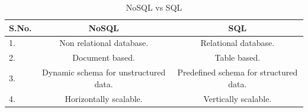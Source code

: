 \documentclass[BTech]{srmuthesis}
\begin{document}
\begin{table}[H]
	\begin{center}
		\label{tab:table1}
		\begin{tabular}{l|c|c}
			\textbf{S.No.} & \textbf{NoSQL} & \textbf{SQL} \\
			\hline
			1. & Non relational database. & Relational database. \\
			2. & Document based. & Table based. \\
			3. & Dynamic schema for unstructured data. & Predefined schema for structured data. \\
			4. & Horizontally scalable. & Vertically scalable. \\
		\end{tabular}
	\end{center}
\caption{NoSQL vs SQL}
\end{table}
	
\end{document}
